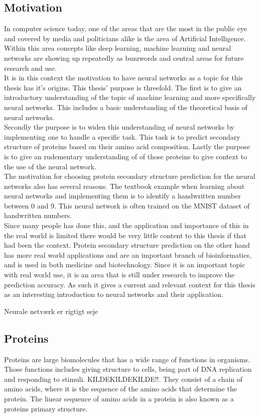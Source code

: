 \subsection{Motivation}
In computer science today, one of the areas that are the most in the public eye and covered by media and politicians alike is the area of Artificial Intelligence. Within this area concepts like deep learning, machine learning and neural networks are showing up repeatedly as buzzwords and central areas for future research and use.\\
It is in this context the motivation to have neural networks as a topic for this thesis has it's origins. This thesis' purpose is threefold. The first is to give an introductory understanding of the topic of machine learning and more specifically neural networks. This includes a basic understanding of the theoretical basis of neural networks. \\
Secondly the purpose is to widen this understanding of neural networks by implementing one to handle a specific task. This task is to predict secondary structure of proteins based on their amino acid composition. Lastly the purpose is to give an rudementary understanding of of those proteins to give context to the use of the neural network.\\
The motivation for choosing protein secondary structure prediction for the neural networks also has several reasons. 
The textbook example when learning about neural networks and implementing them is to identify a handwritten number between 0 and 9. This neural network is often trained on the MNIST dataset of handwritten numbers. \\
Since many people has done this, and the application and importance of this in the real world is limited there would be very little content to this thesis if that had been the context. Protein secondary structure prediction on the other hand has more real world applications and are an important branch of bioinformatics, and is used in both medicine and biotechnology. Since it is an important topic with real world use, it is an area that is still under research to improve the prediction accuracy. As such it gives a current and relevant context for this thesis as an interesting introduction to neural networks and their application.   




  
Neurale netværk er rigtigt seje \cite{bishop2006}
\subsection{Proteins}
Proteins are large biomolecules that has a wide range of functions in organisms. Those functions includes giving structure to cells, being part of DNA replication and responding to stimuli. KILDEKILDEKILDE!!. They consist of a chain of amino acids, where it is the sequence of the amino acids that determine the protein. The linear sequence of amino acids in a protein is also known as a proteins primary structure. 

